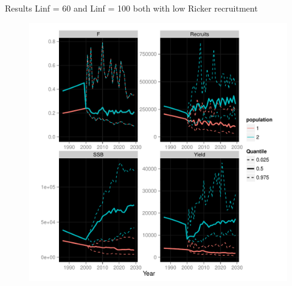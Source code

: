 \documentclass{beamer}
\begin{document}
\begin{withoutheadline}
\begin{frame}{Results}
  Linf = 60 and Linf = 100 both with low Ricker recruitment
  \begin{figure}
  \flushleft
  \includegraphics[width=.7\textwidth]{full-result2}
  \end{figure}
\end{frame}
\end{withoutheadline}



\end{document}

